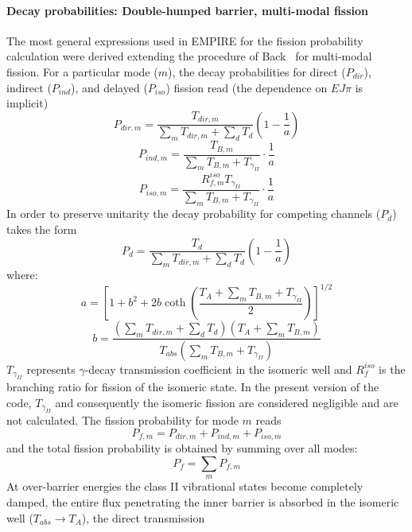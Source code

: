 \documentclass[twocolumn,amsmath,amssymb,10pt,groupedaddress,a4paper]{revtex4}
\begin{document}
\paragraph{Decay probabilities: Double-humped barrier, multi-modal fission}
The most general expressions used in EMPIRE for the fission probability
calculation were derived extending the procedure of Back~\cite{Back:74}
for multi-modal fission. For a particular mode ($m$), the decay probabilities
for direct ($P_{dir}$), indirect ($P_{ind}$), and delayed ($P_{iso}$)
fission read (the dependence on $EJ\pi$ is implicit)
\begin{equation}
P_{dir,m}=\frac{T_{dir,m}}{\sum_{m}T_{dir,m}+\sum_{d}T_{d}}\left(1-\frac{1}{a}\right)
\end{equation}
\begin{equation}
P_{ind,m}=\frac{T_{B,m}}{\sum_{m}T_{B,m}+T_{\gamma_{II}}}\cdot\frac{1}{a}
\end{equation}
\begin{equation}
P_{iso,m}=\frac{R_{f,m}^{iso}T_{\gamma_{II}}}{\sum_{m}T_{B,m}+T_{\gamma_{II}}}\cdot\frac{1}{a}
\end{equation}
 In order to preserve unitarity the decay probability for competing
channels ($P_{d}$) takes the form
\begin{equation}
P_{d}=\frac{T_{d}}{\sum_{m}T_{dir,m}+\sum_{d}T_{d}}\left(1-\frac{1}{a}\right)
\end{equation}
\noindent where: \[
a=\left[1+b^{2}+2b\coth\left(\frac{T_{A}+\sum_{m}T_{B,m}+T_{\gamma_{II}}}{2}\right)\right]^{1/2}\]
 \[
b=\frac{(\sum_{m}T_{dir,m}+\sum_{d}T_{d})(T_{A}+\sum_{m}T_{B,m})}{T_{abs}(\sum_{m}T_{B,m}+T_{\gamma_{II}})}\]
 $T_{\gamma_{II}}$ represents $\gamma$-decay transmission coefficient
in the isomeric well and $R_{f}^{iso}$ is the branching ratio for
fission of the isomeric state. In the present version of the code,
$T_{\gamma_{II}}$ and consequently the isomeric
fission are considered negligible and are not calculated. The fission
probability for mode $m$ reads
\begin{equation}
P_{f,m}=P_{dir,m}+P_{ind,m}+P_{iso,m}
\end{equation}
 and the total fission probability is obtained by summing over all
modes:
\begin{equation}
P_{f}=\sum_{m}P_{f,m}
\end{equation}
 At over-barrier energies the class II vibrational states become completely
damped, the entire flux penetrating the inner barrier is absorbed
in the isomeric well ($T_{abs}\rightarrow T_{A}$), the direct transmission
\end{document}
